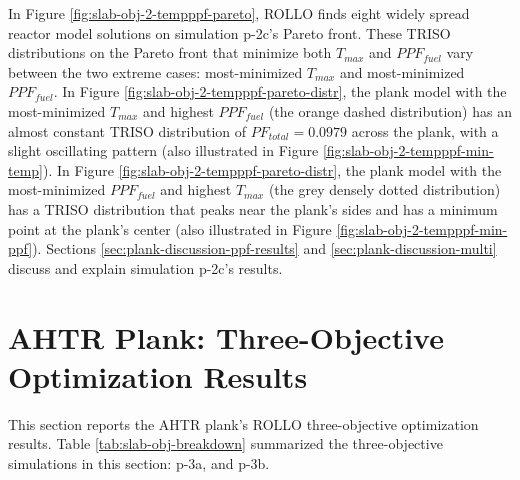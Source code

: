 In Figure \ref{fig:slab-obj-2-tempppf-pareto}, \gls{ROLLO} finds eight widely spread 
reactor model solutions on simulation p-2c's Pareto front. 
These \gls{TRISO} distributions on the Pareto front that minimize both $T_{max}$ 
and $PPF_{fuel}$ vary between the two extreme cases: 
most-minimized $T_{max}$ and most-minimized $PPF_{fuel}$.
In Figure \ref{fig:slab-obj-2-tempppf-pareto-distr}, the plank model with 
the most-minimized $T_{max}$ and highest $PPF_{fuel}$ (the orange dashed distribution) 
has an almost constant TRISO distribution of $PF_{total}=0.0979$ across the plank, 
with a slight oscillating pattern (also illustrated in Figure 
\ref{fig:slab-obj-2-tempppf-min-temp}).
In Figure \ref{fig:slab-obj-2-tempppf-pareto-distr}, the plank model with the
most-minimized $PPF_{fuel}$ and highest $T_{max}$ (the grey densely dotted 
distribution) has a TRISO distribution that peaks near the plank's sides and has 
a minimum point at the plank's center (also illustrated in Figure 
\ref{fig:slab-obj-2-tempppf-min-ppf}). 
Sections \ref{sec:plank-discussion-ppf-results} and \ref{sec:plank-discussion-multi} 
discuss and explain simulation p-2c's results.

\section{AHTR Plank: Three-Objective Optimization Results}
\label{sec:plank-three-obj}
This section reports the \gls{AHTR} plank's \gls{ROLLO} three-objective 
optimization results. 
Table \ref{tab:slab-obj-breakdown} summarized the three-objective simulations in this 
section: p-3a, and p-3b. 

